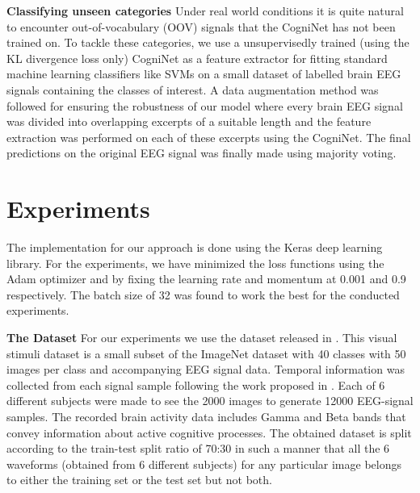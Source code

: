 \documentclass{article}
\begin{document}
\textbf{Classifying unseen categories}
Under real world conditions it is quite natural to encounter out-of-vocabulary (OOV) signals that the CogniNet has not been trained on. To tackle these categories, we use a unsupervisedly trained (using the KL divergence loss only) CogniNet as a feature extractor for fitting standard machine learning classifiers like SVMs on a small dataset of labelled brain EEG signals containing the classes of interest. A data augmentation method was followed for ensuring the robustness of our model where every brain EEG signal was divided into overlapping excerpts of a suitable length and the feature extraction was performed on each of these excerpts using the CogniNet. The final predictions on the original EEG signal was finally made using majority voting. 

\section{Experiments}
\label{sec:exp}

The implementation for our approach is done using the Keras deep learning library. For the experiments, we have minimized the loss functions using the Adam optimizer and by fixing the learning rate and momentum at 0.001 and 0.9 respectively. The batch size of 32 was found to work the best for the conducted experiments.

\textbf{The Dataset}
For our experiments we use the dataset released in \cite{spampinato2017deep}. This visual stimuli dataset is a small subset of the ImageNet dataset with 40 classes with 50 images per class and accompanying EEG signal data. Temporal information was collected from each signal sample following the work proposed in \cite{spampinato2017deep}. Each of 6 different subjects were made to see the 2000 images to generate 12000 EEG-signal samples. The recorded brain activity data includes Gamma and Beta bands \cite{spampinato2017deep} that convey information about active cognitive processes. The obtained dataset is split according to the train-test split ratio of 70:30 in such a manner that all the 6 waveforms (obtained from 6 different subjects) for any particular image belongs to either the training set or the test set but not both.
\end{document}
